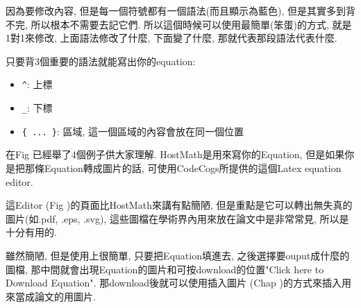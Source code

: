 因為要修改內容, 但是每一個符號都有一個語法(而且顯示為藍色), 但是其實多到背不完, 所以根本不需要去記它們. 所以這個時候可以使用最簡單(笨蛋)的方式, 就是1對1來修改, 上面語法修改了什麼, 下面變了什麼, 那就代表那段語法代表什麼.

只要背3個重要的語法就能寫出你的equation:
  \begin{itemize}
    \item \verb|^|: 上標
    \item \verb|_|: 下標
    \item \verb|{ ... }|: 區域, 這一個區域的內容會放在同一個位置
  \end{itemize}

在Fig 已經舉了4個例子供大家理解.
\newpage
{}
HostMath是用來寫你的Equation, 但是如果你是把那條Equation轉成圖片的話, 可使用CodeCogs所提供的這個Latex equation editor.

這Editor (Fig )的頁面比HostMath來講有點簡陋, 但是重點是它可以轉出無失真的圖片(如.pdf, .eps, .svg), 這些圖檔在學術界內用來放在論文中是非常常見, 所以是十分有用的.


雖然簡陋, 但是使用上很簡單, 只要把Equation填進去, 之後選擇要ouput成什麼的圖檔, 那中間就會出現Equation的圖片和可按download的位置"Click here to Download Equation". 那download後就可以使用插入圖片 (Chap )的方式來插入用來當成論文的用圖片.

